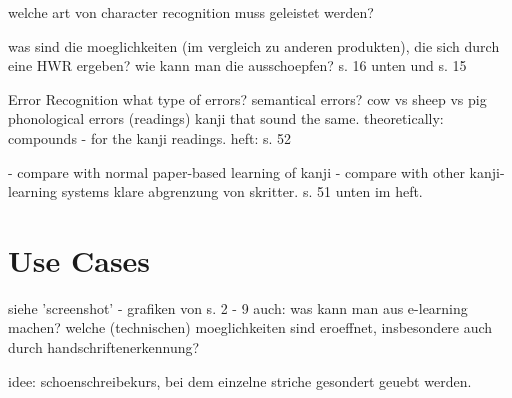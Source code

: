 
welche art von character recognition muss geleistet werden?

was sind die moeglichkeiten (im vergleich zu anderen produkten),
die sich durch eine HWR ergeben?
wie kann man die ausschoepfen? s. 16 unten und s. 15

Error Recognition
what type of errors?
semantical errors? cow vs sheep vs pig
phonological errors (readings) kanji that sound the same.
theoretically: compounds - for the kanji readings.
heft: s. 52

- compare with normal paper-based learning of kanji
- compare with other kanji-learning systems
klare abgrenzung von skritter.
s. 51 unten im heft.



\section{Use Cases}
\label{sec:concept:usecases}

siehe 'screenshot' - grafiken von s. 2 - 9
auch: was kann man aus e-learning machen?
welche (technischen) moeglichkeiten sind eroeffnet,
insbesondere auch durch handschriftenerkennung?

idee: schoenschreibekurs, bei dem einzelne striche
gesondert geuebt werden.

